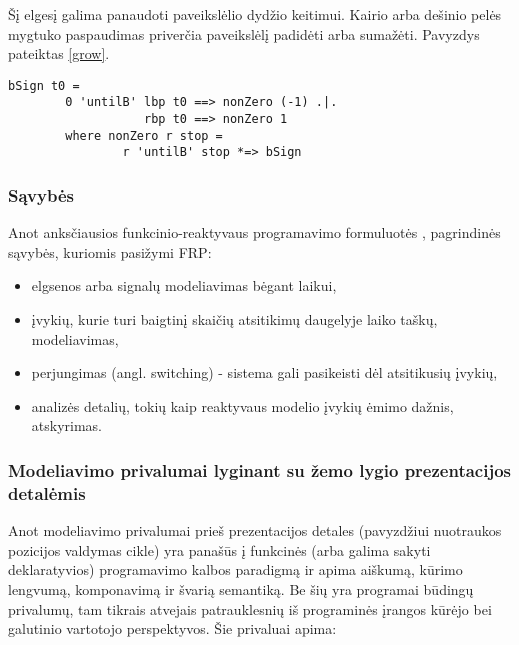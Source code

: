 Šį elgesį galima panaudoti paveikslėlio dydžio keitimui. Kairio arba dešinio pelės mygtuko paspaudimas priverčia paveikslėlį padidėti arba sumažėti. Pavyzdys pateiktas \ref{grow}.


\begin{lstlisting}[caption=- paveiksliuko dydžio modifikavimas pelės paspaudimu, label=grow]
	bSign t0 =
		0 'untilB' lbp t0 ==> nonZero (-1) .|.
				   rbp t0 ==> nonZero 1
		where nonZero r stop =
				r 'untilB' stop *=> bSign
\end{lstlisting}




\subsubsection{Sąvybės}

Anot anksčiausios funkcinio-reaktyvaus programavimo formuluotės \cite{ElliottHudak97:Fran}, pagrindinės sąvybės, kuriomis pasižymi FRP:

\begin{itemize}

	\item elgsenos arba signalų modeliavimas bėgant laikui,

	\item įvykių, kurie turi baigtinį skaičių atsitikimų daugelyje laiko taškų, modeliavimas,

	\item perjungimas (angl. switching) - sistema gali pasikeisti dėl atsitikusių įvykių,

	\item analizės detalių, tokių kaip reaktyvaus modelio įvykių ėmimo dažnis, atskyrimas.

\end{itemize}



\subsubsection{Modeliavimo privalumai lyginant su žemo lygio prezentacijos detalėmis}

Anot \cite{ElliottHudak97:Fran} modeliavimo privalumai prieš prezentacijos detales (pavyzdžiui nuotraukos pozicijos valdymas cikle) yra panašūs į funkcinės (arba galima sakyti deklaratyvios) programavimo kalbos paradigmą ir apima aiškumą, kūrimo lengvumą, komponavimą ir švarią semantiką. Be šių yra programai būdingų privalumų, tam tikrais atvejais patrauklesnių iš programinės įrangos kūrėjo bei galutinio vartotojo perspektyvos. Šie privaluai apima:

